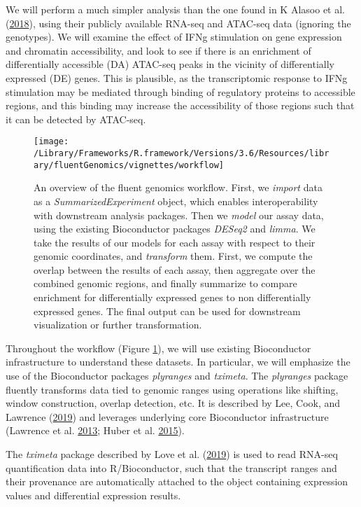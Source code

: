 \documentclass[
]{article}
\begin{document}
We will perform a much simpler analysis than the one found in
K Alasoo et al. (\protect\hyperlink{ref-alasoo}{2018}), using their publicly available RNA-seq and ATAC-seq data (ignoring the
genotypes). We will examine the effect of IFNg stimulation on gene expression
and chromatin accessibility, and look to see if there is an enrichment of
differentially accessible (DA) ATAC-seq peaks in the vicinity of differentially
expressed (DE) genes. This is plausible, as the transcriptomic response to IFNg
stimulation may be mediated through binding of regulatory proteins to
accessible regions, and this binding may increase the accessibility of those
regions such that it can be detected by ATAC-seq.

\begin{figure}

{\centering \texttt{[image: /Library/Frameworks/R.framework/Versions/3.6/Resources/library/fluentGenomics/vignettes/workflow]} 

}

\caption{An overview of the fluent genomics workflow. First, we \emph{import}
data as a \emph{SummarizedExperiment} object, which enables interoperability with
downstream analysis packages. Then we \emph{model} our assay data, using the
existing Bioconductor packages \emph{DESeq2} and \emph{limma}. We take the results of our
models for each assay with respect to their genomic coordinates, and
\emph{transform} them. First, we compute the overlap between the results of each
assay, then aggregate over the combined genomic regions, and finally summarize
to compare enrichment for differentially expressed genes to non differentially expressed
genes. The final output can be used for downstream visualization or further
transformation.}\label{fig:workflow}
\end{figure}

Throughout the workflow (Figure \ref{fig:workflow}), we will use existing
Bioconductor infrastructure to understand these datasets. In particular, we
will emphasize the use of the Bioconductor packages \emph{plyranges} and \emph{tximeta}.
The \emph{plyranges} package fluently transforms data tied to genomic ranges
using operations like shifting, window construction, overlap
detection, etc. It is described by Lee, Cook, and Lawrence (\protect\hyperlink{ref-Lee2019}{2019}) and leverages underlying core
Bioconductor infrastructure (Lawrence et al. \protect\hyperlink{ref-granges}{2013}; Huber et al. \protect\hyperlink{ref-bioc}{2015}).

The \emph{tximeta} package described by Love et al. (\protect\hyperlink{ref-Love2019-tximeta}{2019}) is
used to read RNA-seq quantification data into R/Bioconductor, such that the
transcript ranges and their provenance are automatically attached to the object
containing expression values and differential expression results.
\end{document}
